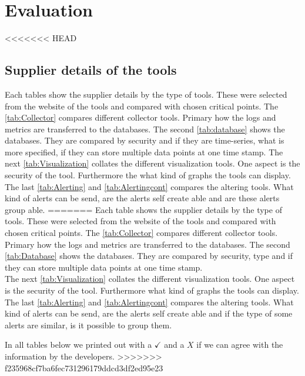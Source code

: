 \chapter{Evaluation} %
<<<<<<< HEAD
\section{Supplier details of the tools}
Each tables show the supplier details by the type of tools. These were selected from the website of the tools and compared with chosen critical points. The \cref{tab:Collector} compares different collector tools. Primary how the logs and metrics are transferred to the databases. The second \cref{tab:database} shows the databases. They are compared by security and if they are time-series, what is more specified, if they can store multiple data points at one time stamp. The next \cref{tab:Visualization} collates the different visualization tools. One aspect is the security of the tool. Furthermore the what kind of graphs the tools can display. The last \cref{tab:Alerting} and \cref{tab:Alertingcont} compares the altering tools. What kind of alerts can be send, are the alerts self create able and are these alerts group able. 
=======
Each table shows the supplier details by the type of tools. These were selected from the website of the tools and compared with chosen critical points. The \cref{tab:Collector} compares different collector tools. Primary how the logs and metrics are transferred to the databases. The second \cref{tab:Database} shows the databases. They are compared by security, type and if they can store multiple data points at one time stamp. \\
The next \cref{tab:Visualization} collates the different visualization tools. One aspect is the security of the tool. Furthermore what kind of graphs the tools can display. The last \cref{tab:Alerting} and \cref{tab:Alertingcont} compares the altering tools. What kind of alerts can be send, are the alerts self create able and if the type of some alerts are similar, is it possible to group them.

In all tables below we printed out with a $ \checkmark $ and a $ X $ if we can agree with the information by the developers.
>>>>>>> f235968cf7ba6fec731296179ddcd3df2ed95e23


